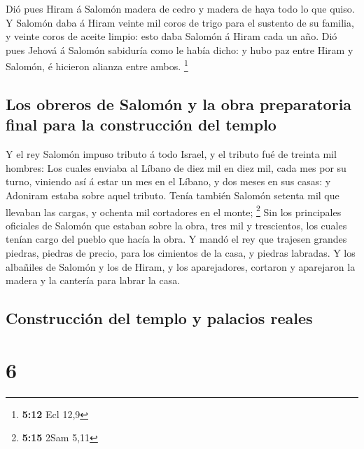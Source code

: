  Dió pues Hiram á Salomón madera de cedro y madera de haya
todo lo que quiso.  Y Salomón daba á Hiram veinte mil coros
de trigo para el sustento de su familia, y veinte coros de aceite
limpio: esto daba Salomón á Hiram cada un año.  Dió pues
Jehová á Salomón sabiduría como le había dicho: y hubo paz entre Hiram y
Salomón, é hicieron alianza entre ambos. \footnote{\textbf{5:12} Ecl
  12,9}

\hypertarget{los-obreros-de-salomuxf3n-y-la-obra-preparatoria-final-para-la-construcciuxf3n-del-templo}{%
\subsection{Los obreros de Salomón y la obra preparatoria final para la
construcción del
templo}\label{los-obreros-de-salomuxf3n-y-la-obra-preparatoria-final-para-la-construcciuxf3n-del-templo}}

 Y el rey Salomón impuso tributo á todo Israel, y el
tributo fué de treinta mil hombres:  Los cuales enviaba al
Líbano de diez mil en diez mil, cada mes por su turno, viniendo así á
estar un mes en el Líbano, y dos meses en sus casas: y Adoniram estaba
sobre aquel tributo.  Tenía también Salomón setenta mil que
llevaban las cargas, y ochenta mil cortadores en el monte; \footnote{\textbf{5:15}
  2Sam 5,11}  Sin los principales oficiales de Salomón que
estaban sobre la obra, tres mil y trescientos, los cuales tenían cargo
del pueblo que hacía la obra.  Y mandó el rey que trajesen
grandes piedras, piedras de precio, para los cimientos de la casa, y
piedras labradas.  Y los albañiles de Salomón y los de
Hiram, y los aparejadores, cortaron y aparejaron la madera y la cantería
para labrar la casa.

\hypertarget{construcciuxf3n-del-templo-y-palacios-reales}{%
\subsection{Construcción del templo y palacios
reales}\label{construcciuxf3n-del-templo-y-palacios-reales}}

\hypertarget{section-5}{%
\section{6}\label{section-5}}

